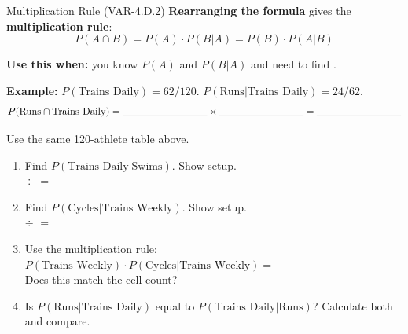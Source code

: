 \documentclass[10pt]{article}
\begin{document}
\vspace{0.1in}

\begin{notesbox}{Multiplication Rule (VAR-4.D.2)}
\small
\textbf{Rearranging the formula} gives the \textbf{multiplication rule}:
\[
  P(A \cap B) = P(A) \cdot P(B|A) = P(B) \cdot P(A|B)
\]

\vspace{6pt}
\textbf{Use this when:} you know $P(A)$ and $P(B|A)$ and need to find \blank{4cm}.

\vspace{8pt}
\textbf{Example:} $P(\text{Trains Daily}) = 62/120$. $P(\text{Runs}|\text{Trains Daily}) = 24/62$.
\[
  P(\text{Runs} \cap \text{Trains Daily}) = \blank{3cm} \times \blank{3cm} = \blank{3cm}
\]
\end{notesbox}

\vspace{0.1in}

\begin{practicebox}
\small Use the same 120-athlete table above.

\vspace{6pt}
\begin{enumerate}[leftmargin=1.5em, itemsep=10pt]
  \item Find $P(\text{Trains Daily} | \text{Swims})$. Show setup.\\
        \blank{3cm} $\div$ \blank{3cm} $=$ \blank{3cm}

  \item Find $P(\text{Cycles} | \text{Trains Weekly})$. Show setup.\\
        \blank{3cm} $\div$ \blank{3cm} $=$ \blank{3cm}

  \item Use the multiplication rule: $P(\text{Trains Weekly}) \cdot P(\text{Cycles}|\text{Trains Weekly}) = $ \blank{4cm}\\
        Does this match the cell count? \blank{2cm}

  \item Is $P(\text{Runs}|\text{Trains Daily})$ equal to $P(\text{Trains Daily}|\text{Runs})$?
        Calculate both and compare.\\
        \writeline\writeline
\end{enumerate}
\end{practicebox}
\end{document}
